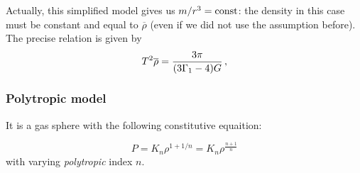 \documentclass[main.tex]{subfiles}
\begin{document}
Actually, this simplified model gives us \(m / r^3 = \text{const}\): the density in this case must be constant and equal to \(\overline{\rho}\) (even if we did not use the assumption before). 
The precise relation is given by 
%
\begin{align}
T^2 \overline{\rho} = \frac{3 \pi }{\qty(3 \Gamma_1 -4) G}
\,,
\end{align}
%


\subsubsection{Polytropic model}

It is a gas sphere with the following constitutive equaition:

\begin{equation}
  P = K_n \rho^{1 + 1/n} = K_n \rho^{\frac{n+1}{n}}
\end{equation}
%
with varying \emph{polytropic} index \(n\).
\end{document}
